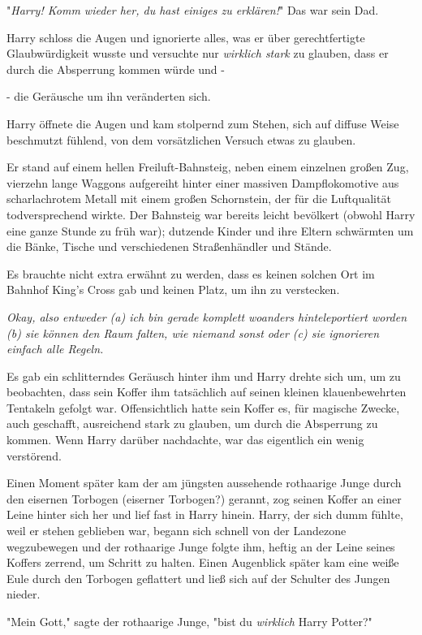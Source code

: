 {"\emph{Harry! Komm wieder her, du hast einiges zu erklären!}" Das war sein Dad.

Harry schloss die Augen und ignorierte alles, was er über gerechtfertigte Glaubwürdigkeit wusste und versuchte nur \emph{wirklich stark} zu glauben, dass er durch die Absperrung kommen würde und -

- die Geräusche um ihn veränderten sich.

Harry öffnete die Augen und kam stolpernd zum Stehen, sich auf diffuse Weise beschmutzt fühlend, von dem vorsätzlichen Versuch etwas zu glauben.

Er stand auf einem hellen Freiluft-Bahnsteig, neben einem einzelnen großen Zug, vierzehn lange Waggons aufgereiht hinter einer massiven Dampflokomotive aus scharlachrotem Metall mit einem großen Schornstein, der für die Luftqualität todversprechend wirkte. Der Bahnsteig war bereits leicht bevölkert (obwohl Harry eine ganze Stunde zu früh war); dutzende Kinder und ihre Eltern schwärmten um die Bänke, Tische und verschiedenen Straßenhändler und Stände.

Es brauchte nicht extra erwähnt zu werden, dass es keinen solchen Ort im Bahnhof King's Cross gab und keinen Platz, um ihn zu verstecken.

\emph{Okay, also entweder (a) ich bin gerade komplett woanders hinteleportiert worden (b) sie können den Raum falten, wie niemand sonst oder (c) sie ignorieren einfach alle Regeln.}

Es gab ein schlitterndes Geräusch hinter ihm und Harry drehte sich um, um zu beobachten, dass sein Koffer ihm tatsächlich auf seinen kleinen klauenbewehrten Tentakeln gefolgt war. Offensichtlich hatte sein Koffer es, für magische Zwecke, auch geschafft, ausreichend stark zu glauben, um durch die Absperrung zu kommen. Wenn Harry darüber nachdachte, war das eigentlich ein wenig verstörend.

Einen Moment später kam der am jüngsten aussehende rothaarige Junge durch den eisernen Torbogen (eiserner Torbogen?) gerannt, zog seinen Koffer an einer Leine hinter sich her und lief fast in Harry hinein. Harry, der sich dumm fühlte, weil er stehen geblieben war, begann sich schnell von der Landezone wegzubewegen und der rothaarige Junge folgte ihm, heftig an der Leine seines Koffers zerrend, um Schritt zu halten. Einen Augenblick später kam eine weiße Eule durch den Torbogen geflattert und ließ sich auf der Schulter des Jungen nieder.

"Mein Gott," sagte der rothaarige Junge, "bist du \emph{wirklich} Harry Potter?"

}
